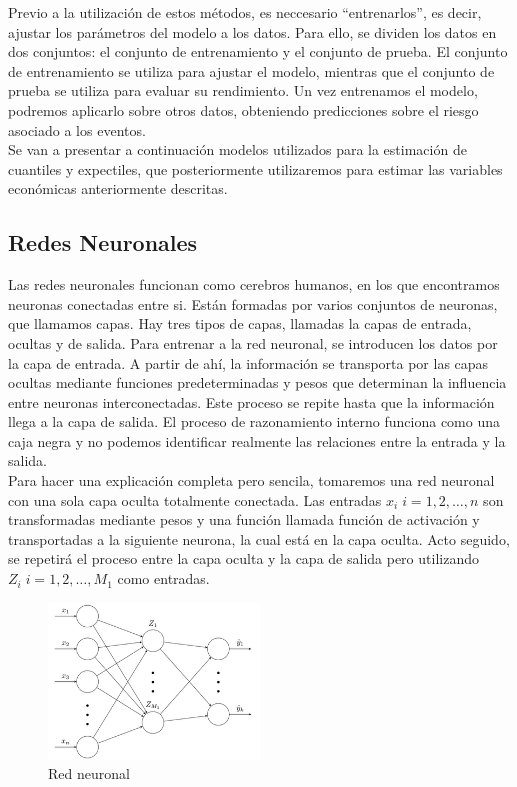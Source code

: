 \documentclass[11pt]{book}
\theoremstyle{plain} %
\theoremstyle{definition} %
\begin{document}
Previo a la utilización de estos métodos, es neccesario “entrenarlos”, es decir, ajustar los 
parámetros del modelo a los datos. Para ello, se dividen los datos en dos conjuntos: el 
conjunto de entrenamiento y el conjunto de prueba. El conjunto de entrenamiento se 
utiliza para ajustar el modelo, mientras que el conjunto de prueba se utiliza para evaluar 
su rendimiento. Un vez entrenamos el modelo, podremos aplicarlo sobre otros datos, 
obteniendo predicciones sobre el riesgo asociado a los eventos.\\

Se van a presentar a continuación modelos utilizados para la estimación de cuantiles y 
expectiles, que posteriormente utilizaremos para estimar las variables económicas 
anteriormente descritas. 

\subsection{Redes Neuronales}
Las redes neuronales funcionan como cerebros humanos, en los que encontramos 
neuronas conectadas entre si. Están formadas por varios conjuntos de neuronas, que 
llamamos capas.  Hay tres tipos de capas, llamadas la capas de entrada, ocultas y de salida. 
Para entrenar a la red neuronal, se introducen los datos por la capa de entrada. A partir de 
ahí, la información se transporta por las capas ocultas mediante funciones predeterminadas 
y pesos que determinan la influencia entre neuronas interconectadas. Este proceso se 
repite hasta que la información llega a la capa de salida. El proceso de razonamiento 
interno funciona como una caja negra y no podemos identificar realmente las relaciones 
entre la entrada y la salida. \\

Para hacer una explicación completa pero sencila, tomaremos una red neuronal con 
una sola capa oculta totalmente conectada. Las entradas $x_{i} \; i= 1, 2, \dots, n$ son 
transformadas mediante pesos y una función llamada función de activación y transportadas 
a la siguiente neurona, la cual está en la capa oculta. Acto seguido, se repetirá el proceso 
entre la capa oculta y la capa de salida pero utilizando $Z_i \; i= 1, 2, \dots, M_1$ como 
entradas.

\begin{figure}[h]
    \centering
    \includegraphics[width=0.5\textwidth]{picture1.png} 
    \caption{Red neuronal}
    \label{fig:miImagen} 
\end{figure}
\end{document}
